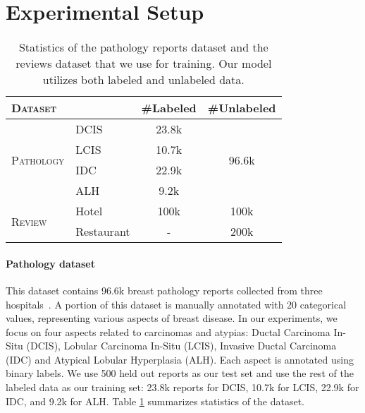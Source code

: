 
\section{Experimental Setup}\label{sec:setup}

\begin{table}[t]
\begin{small}
    \centering
    \begin{tabular}{llcc}
	\toprule
    \multicolumn{2}{l}{\textsc{Dataset}} & \#Labeled & \#Unlabeled \\
    \midrule
    \multirow{4}{*}{\textsc{Pathology}} & DCIS & 23.8k & \multirow{4}{*}{96.6k} \\
     & LCIS & 10.7k &  \\
     & IDC & 22.9k &  \\
     & ALH & 9.2k &  \\
     \midrule
    \multirow{2}{*}{\textsc{Review}} & Hotel & 100k & 100k \\
     & Restaurant & - & 200k \\
    \bottomrule
    \end{tabular}
\end{small}
    \caption{Statistics of the pathology reports dataset and the reviews dataset that we use for training. Our model utilizes both labeled and unlabeled data.
    }\label{tb:data}
\end{table}


\paragraph{Pathology dataset}
This dataset contains 96.6k breast pathology reports collected from three hospitals~\cite{Yala:2016a}. A portion of this dataset is manually annotated with 20 categorical values, representing various aspects of breast disease. In our experiments, we focus on four aspects related to carcinomas and atypias:  Ductal Carcinoma In-Situ (DCIS), Lobular Carcinoma In-Situ (LCIS), Invasive Ductal Carcinoma (IDC) and Atypical Lobular Hyperplasia (ALH). Each aspect is annotated using binary labels. We use 500 held out reports as our test set and use the rest of the labeled data as our training set: 23.8k reports for DCIS, 10.7k for LCIS, 22.9k for IDC, and 9.2k for ALH. Table \ref{tb:data} summarizes statistics of the dataset.

